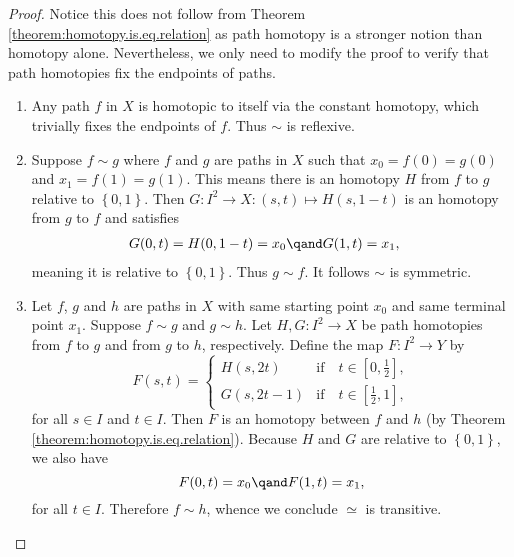 \begin{proof} Notice this does not follow from Theorem \ref{theorem:homotopy.is.eq.relation} as path homotopy is a stronger notion than homotopy alone. Nevertheless, we only need to modify the proof to verify that path homotopies fix the endpoints of paths.
\begin{enumerate}[label=(\roman*)]
    \item Any path \(f\) in \(X\) is homotopic to itself via the constant homotopy, which trivially fixes the endpoints of \(f\). Thus \(\sim\) is reflexive.
    \item Suppose \(f\sim g\) where \(f\) and \(g\) are paths in \(X\) such that \(x_0 = f(0) = g(0)\) and \(x_1=f(1)=g(1)\). This means  there is an homotopy \(H\) from \(f\) to \(g\) relative to \(\left\{ 0,1 \right\}\). Then \(G\colon   I^2 \to X: (s,t)\mapsto H(s,1-t)\) is an homotopy from \(g\) to \(f\)   and satisfies 
    \begin{align*}
        G(0,t) &= H(0,1-t) =  x_0 \qand G(1,t) = x_1,
    \end{align*}
    meaning it is relative to \(\left\{ 0,1 \right\}\). Thus \(g\sim f\). It follows   \(\sim\) is symmetric.

    \item Let \(f\), \(g\) and \(h\) are paths in \(X\) with same starting point \(x_0\) and same terminal point \(x_1\). Suppose \(f\sim g\) and \(g\sim h\). Let \(H,G\colon  I^2 \to X\) be path  homotopies from \(f\) to \(g\) and from \(g\) to \(h\), respectively. Define the map \(F\colon  I^2 \to  Y\) by \[
        F(s,t) = \begin{cases}
            H(s,2t)     & \text{if}\quad t\in [0,\frac{1}{2}],\\
            G(s,2t -1)  & \text{if}\quad t\in [\frac{1}{2},1],
        \end{cases}
    \] for all \(s\in I\) and \(t\in I\). Then \(F\) is an homotopy between \(f\) and \(h\) (by Theorem \ref{theorem:homotopy.is.eq.relation}). Because \(H\) and \(G\) are relative to \(\left\{ 0,1 \right\}\), we also have 
    \[F(0,t) =    x_0 \qand F(1,t) = x_1,\]
    for all \(t\in I\). Therefore \(f\sim h\), whence we conclude  \(\simeq\) is transitive.
\end{enumerate}
    

\end{proof}
